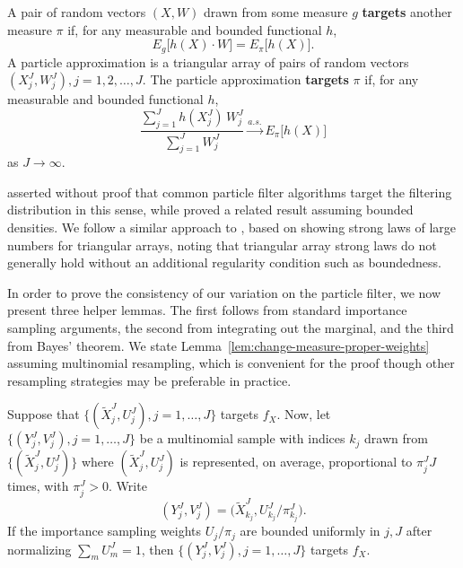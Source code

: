 \documentclass[11pt]{article}
\theoremstyle{thmstylethree}%
\begin{document}
\begin{defn}[Targeting]
    A pair of random vectors $(X, W)$ drawn from some measure $g$ \textbf{targets} another measure $\pi$ if, for any measurable and bounded functional $h$,
\begin{equation}
    E_g\big[h(X) \cdot W\big]=E_\pi\big[h(X)\big].
\end{equation}  
    A particle approximation is a triangular array of pairs of random vectors $(X^J_j, W^J_j), j=1,2, \ldots,J$.
    The particle approximation \textbf{targets} $\pi$ if, for any measurable and bounded functional $h$,
\begin{equation}
    \frac{\sum_{j=1}^J h(X^J_j) \, W^J_j}{\sum_{j=1}^J W^J_j} \stackrel{a.s.}{\to} E_\pi\big[h(X)\big]
\end{equation}
as $J \to \infty$.
\end{defn}
\cite{chopin04} asserted without proof that common particle filter algorithms target the filtering distribution in this sense, while \cite{chopin20} proved a related result assuming bounded densities.
We follow a similar approach to \cite{chopin20}, based on showing strong laws of large numbers for triangular arrays, noting that triangular array strong laws do not generally hold without an additional regularity condition such as boundedness.
 
In order to prove the consistency of our variation on the particle filter, we now present three helper lemmas.
The first follows from standard importance sampling arguments, the second from integrating out the marginal, and the third from Bayes' theorem. 
We state Lemma~\ref{lem:change-measure-proper-weights} assuming multinomial resampling, which is convenient for the proof though other resampling strategies may be preferable in practice.

\begin{lem}
    \label{lem:change-measure-proper-weights}
    Suppose that $\{(\tilde X_j^J,U_j^J),j=1,\dots,J\}$ targets $f_X$. Now, let $\{(Y_j^J,V_j^J),j=1,\dots,J\}$ be a multinomial sample with indices $k_j$ drawn from $\{(\tilde X_j^J,U_j^J)\}$ where $(\tilde X_j^J,U_j^J)$ is represented, on average, proportional to $\pi^J_j J$ times, with $\pi_j^J>0$. Write
    \begin{equation}
    (Y_j^J,V_j^J) = \big(\tilde X^J_{k_j},U^J_{k_j}\big/\pi^J_{k_j}\big).
    \end{equation} 
    If the importance sampling weights $U_j/\pi_j$ are bounded uniformly in $j,J$ after normalizing $\sum_m U_m^J=1$, then $\{(Y^J_j,V^J_j),j=1,\dots,J\}$ targets $f_X$.
\end{lem}
\end{document}
